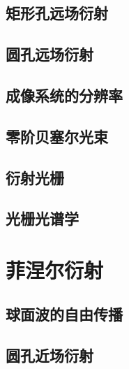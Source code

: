 \documentclass[UTF8]{report}
\theoremstyle{MyLineTheoremStyle} %
\theoremstyle{MyBlockTheoremStyle} %
\theoremstyle{MySubsubsectionStyle} %
\begin{document}
\subsection{矩形孔远场衍射}

\subsection{圆孔远场衍射}

\subsection{成像系统的分辨率}

\subsection{零阶贝塞尔光束}

\subsection{衍射光栅}

\subsection{光栅光谱学}

\section{菲涅尔衍射}

\subsection{球面波的自由传播}

\subsection{圆孔近场衍射}
\end{document}
